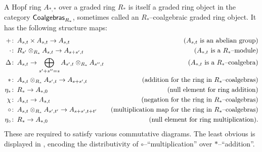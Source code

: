 \begin{definition}
A Hopf ring $A_{*, *}$ over a graded ring $R_*$ is itself a graded ring object in the category $\mathsf{Coalgebras}_{R_*}$, sometimes called an $R_*$--coalgebraic graded ring object.  It has the following structure maps:
\begin{align*}
+ & \colon\thinspace A_{s, t} \times A_{s, t} \to A_{s, t} & \text{($A_{s, t}$ is an abelian group)} \\
\cdot & \colon\thinspace R_{s'} \otimes_{R_*} A_{s, t} \to A_{s+s', t} & \text{($A_{*, t}$ is a $R_*$--module)} \\
\Delta & \colon\thinspace A_{s, t} \to \bigoplus_{s' + s'' = s} A_{s', t} \otimes_{R_*} A_{s'', t} & \text{($A_{*, t}$ is a $R_*$--coalgebra)} \\
\ast & \colon\thinspace A_{s, t} \otimes_{R_*} A_{s', t} \to A_{s + s', t} & \text{(addition for the ring in $R_*$--coalgebras)} \\
\eta_\ast & \colon\thinspace R_* \to A_{*, 0} & \text{(null element for ring addition)} \\
\chi & \colon\thinspace A_{s, t} \to A_{s, t} & \text{(negation for the ring in $R_*$--coalgebras)} \\
\circ & \colon\thinspace A_{s, t} \otimes_{R_*} A_{s', t'} \to A_{s + s', t + t'} & \text{(multiplication map for the ring in $R_*$--coalgebras)} \\
\eta_\circ & \colon\thinspace R_* \to A_{*, 0} & \text{(null element for ring multiplication)}.
\end{align*}
These are required to satisfy various commutative diagrams. The least obvious is displayed in , encoding the distributivity of $\circ$--``multiplication'' over $\ast$--``addition''.
\begin{figure}
\begin{center}
\end{center}
\end{figure}
\end{definition}
